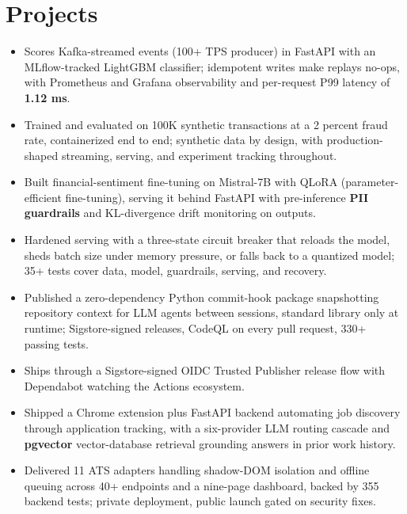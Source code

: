 \documentclass[letterpaper,10pt]{article}
\begin{document}
\section{Projects}
\begin{itemize}
\item Scores Kafka-streamed events (100+ TPS producer) in FastAPI with an MLflow-tracked LightGBM classifier; idempotent writes make replays no-ops, with Prometheus and Grafana observability and per-request P99 latency of \textbf{1.12 ms}.
\item Trained and evaluated on 100K synthetic transactions at a 2 percent fraud rate, containerized end to end; synthetic data by design, with production-shaped streaming, serving, and experiment tracking throughout.
\end{itemize}
\begin{itemize}
\item Built financial-sentiment fine-tuning on Mistral-7B with QLoRA (parameter-efficient fine-tuning), serving it behind FastAPI with pre-inference \textbf{PII guardrails} and KL-divergence drift monitoring on outputs.
\item Hardened serving with a three-state circuit breaker that reloads the model, sheds batch size under memory pressure, or falls back to a quantized model; 35+ tests cover data, model, guardrails, serving, and recovery.
\end{itemize}
\begin{itemize}
\item Published a zero-dependency Python commit-hook package snapshotting repository context for LLM agents between sessions, standard library only at runtime; Sigstore-signed releases, CodeQL on every pull request, 330+ passing tests.
\item Ships through a Sigstore-signed OIDC Trusted Publisher release flow with Dependabot watching the Actions ecosystem.
\end{itemize}
\begin{itemize}
\item Shipped a Chrome extension plus FastAPI backend automating job discovery through application tracking, with a six-provider LLM routing cascade and \textbf{pgvector} vector-database retrieval grounding answers in prior work history.
\item Delivered 11 ATS adapters handling shadow-DOM isolation and offline queuing across 40+ endpoints and a nine-page dashboard, backed by 355 backend tests; private deployment, public launch gated on security fixes.
\end{itemize}
\end{document}
